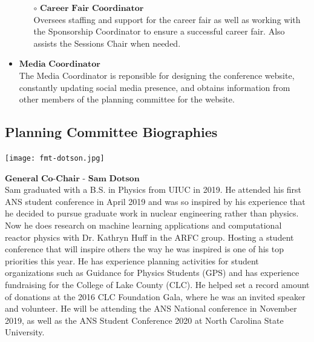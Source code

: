 \begin{itemize}
\begin{itemize}
		\item[$\circ$] $\textbf{Career Fair Coordinator}$\\
		Oversees staffing and support for the career fair as well as working with the Sponsorship
		Coordinator to ensure a successful career fair. Also assists the Sessions Chair when needed.
	\end{itemize}
	\item $\textbf{Media Coordinator}$\\
		The Media Coordinator is reponsible for designing the conference website, constantly updating social media presence,
		and obtains information from other members of the planning committee for the website.
\end{itemize}

\newpage
\subsection{Planning Committee Biographies}

\begin{minipage}{0.25\textwidth}
	\centering
	\texttt{[image: fmt-dotson.jpg]}
\end{minipage}
\begin{minipage}{0.73\textwidth}
	$\textbf{General Co-Chair - Sam Dotson}$\\
Sam graduated with a B.S. in Physics from UIUC in 2019. He attended his first ANS student conference in April 2019 and was so inspired by his experience that he decided to pursue graduate work in nuclear engineering rather than physics. Now he does research on machine learning applications and computational reactor physics with Dr. Kathryn Huff in the ARFC group. Hosting a student conference that will inspire others the way he was inspired is one of his top priorities this year. He has experience planning activities for student organizations such as Guidance for Physics Students (GPS) and has experience fundraising for the College of Lake County (CLC). He helped set a record amount of donations at the 2016 CLC Foundation Gala, where he was an invited speaker and volunteer. He will be attending the ANS National conference in November 2019, as well as the ANS Student Conference 2020 at North Carolina State University.
\end{minipage}

